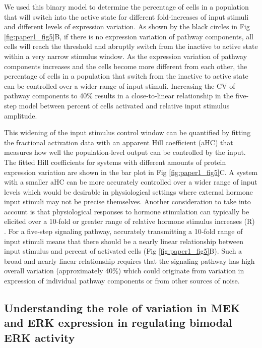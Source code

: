 We used this binary model to determine the percentage of cells in a population that will switch into the active state for different fold‐increases of input stimuli and different levels of expression variation. As shown by the black circles in Fig \ref{fig:paper1_fig5}B, if there is no expression variation of pathway components, all cells will reach the threshold and abruptly switch from the inactive to active state within a very narrow stimulus window. As the expression variation of pathway components increases and the cells become more different from each other, the percentage of cells in a population that switch from the inactive to active state can be controlled over a wider range of input stimuli. Increasing the CV of pathway components to 40\% results in a close‐to‐linear relationship in the five‐step model between percent of cells activated and relative input stimulus amplitude.

This widening of the input stimulus control window can be quantified by fitting the fractional activation data with an apparent Hill coefficient (aHC) that measures how well the population‐level output can be controlled by the input. The fitted Hill coefficients for systems with different amounts of protein expression variation are shown in the bar plot in Fig \ref{fig:paper1_fig5}C. A system with a smaller aHC can be more accurately controlled over a wider range of input levels which would be desirable in physiological settings where external hormone input stimuli may not be precise themselves. Another consideration to take into account is that physiological responses to hormone stimulation can typically be elicited over a 10‐fold or greater range of relative hormone stimulus increases (R) \cite{Atgie1997,Katakam2001,Kimura2007}. For a five‐step signaling pathway, accurately transmitting a 10‐fold range of input stimuli means that there should be a nearly linear relationship between input stimulus and percent of activated cells (Fig \ref{fig:paper1_fig5}B). Such a broad and nearly linear relationship requires that the signaling pathway has high overall variation (approximately 40\%) which could originate from variation in expression of individual pathway components or from other sources of noise.

\subsection{Understanding the role of variation in MEK and ERK expression in regulating bimodal ERK activity}

